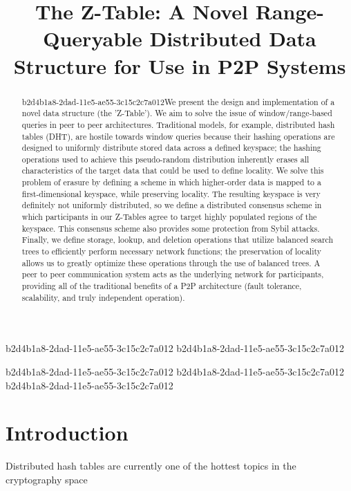 \documentclass[12pt]{article}
\title{The Z-Table: A Novel Range-Queryable Distributed Data Structure for Use in P2P Systems}
\begin{document}
b2d4b1a8-2dad-11e5-ae55-3c15c2c7a012
b2d4b1a8-2dad-11e5-ae55-3c15c2c7a012\maketitle

\begin{abstract}
b2d4b1a8-2dad-11e5-ae55-3c15c2c7a012We present the design and implementation of a novel data structure (the 'Z-Table'). We aim to solve the issue of window/range-based queries in peer to peer architectures. Traditional models, for example,  distributed hash tables (DHT), are hostile towards window queries because their hashing operations are designed to uniformly distribute stored data across a defined keyspace; the hashing operations used to achieve this pseudo-random distribution inherently erases all characteristics of the target data that could be used to define locality. We solve this problem of erasure by defining a scheme in which higher-order data is mapped to a first-dimensional keyspace, while preserving locality. The resulting keyspace is very definitely not uniformly distributed, so we define a distributed consensus scheme in which participants in our Z-Tables agree to target highly populated regions of the keyspace. This consensus scheme also provides some protection from Sybil attacks. Finally, we define storage, lookup, and deletion operations that utilize balanced search trees to efficiently perform necessary network functions; the preservation of locality allows us to greatly optimize these operations through the use of balanced trees. A peer to peer communication system acts as the underlying network for participants, providing all of the traditional benefits of a P2P architecture (fault tolerance, scalability, and truly independent operation).
\end{abstract}
b2d4b1a8-2dad-11e5-ae55-3c15c2c7a012
b2d4b1a8-2dad-11e5-ae55-3c15c2c7a012
b2d4b1a8-2dad-11e5-ae55-3c15c2c7a012\newpage
\section{Introduction}
Distributed hash tables are currently one of the hottest topics in the cryptography space~\cite{Stoica:2001dj,Rowstron:2001ea,Ratnasamy:2001wn}

\printbibliography
\end{document}
